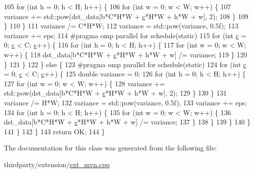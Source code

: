 \begin{DoxyCode}
105                         \textcolor{keywordflow}{for} (\textcolor{keywordtype}{int} h = 0; h < H; h++) \{
106                             \textcolor{keywordflow}{for} (\textcolor{keywordtype}{int} w = 0; w < W; w++) \{
107                                 variance += std::pow(dst\_data[b*C*H*W + \hyperlink{CMakeCache_8txt_aac1d6a1710812201527c735f7c6afbaa}{c}*H*W + h*W + w], 2);
108                             \}
109                         \}
110                     \}
111                     variance /= C*H*W;
112                     variance = std::pow(variance, 0.5f);
113                     variance += eps;
114 \textcolor{preprocessor}{                    #pragma omp parallel for schedule(static)}
115                     \textcolor{keywordflow}{for} (\textcolor{keywordtype}{int} \hyperlink{CMakeCache_8txt_aac1d6a1710812201527c735f7c6afbaa}{c} = 0; \hyperlink{CMakeCache_8txt_aac1d6a1710812201527c735f7c6afbaa}{c} < C; \hyperlink{CMakeCache_8txt_aac1d6a1710812201527c735f7c6afbaa}{c}++) \{
116                         \textcolor{keywordflow}{for} (\textcolor{keywordtype}{int} h = 0; h < H; h++) \{
117                             \textcolor{keywordflow}{for} (\textcolor{keywordtype}{int} w = 0; w < W; w++) \{
118                                 dst\_data[b*C*H*W + \hyperlink{CMakeCache_8txt_aac1d6a1710812201527c735f7c6afbaa}{c}*H*W + h*W + w] /= variance;
119                             \}
120                         \}
121                     \}
122                 \} \textcolor{keywordflow}{else} \{
123 \textcolor{preprocessor}{                    #pragma omp parallel for schedule(static)}
124                     \textcolor{keywordflow}{for} (\textcolor{keywordtype}{int} \hyperlink{CMakeCache_8txt_aac1d6a1710812201527c735f7c6afbaa}{c} = 0; \hyperlink{CMakeCache_8txt_aac1d6a1710812201527c735f7c6afbaa}{c} < C; \hyperlink{CMakeCache_8txt_aac1d6a1710812201527c735f7c6afbaa}{c}++) \{
125                         \textcolor{keywordtype}{double} variance = 0;
126                         \textcolor{keywordflow}{for} (\textcolor{keywordtype}{int} h = 0; h < H; h++) \{
127                             \textcolor{keywordflow}{for} (\textcolor{keywordtype}{int} w = 0; w < W; w++) \{
128                                 variance += std::pow(dst\_data[b*C*H*W + \hyperlink{CMakeCache_8txt_aac1d6a1710812201527c735f7c6afbaa}{c}*H*W + h*W + w], 2);
129                             \}
130                         \}
131                         variance /= H*W;
132                         variance = std::pow(variance, 0.5f);
133                         variance += eps;
134                         \textcolor{keywordflow}{for} (\textcolor{keywordtype}{int} h = 0; h < H; h++) \{
135                             \textcolor{keywordflow}{for} (\textcolor{keywordtype}{int} w = 0; w < W; w++) \{
136                                 dst\_data[b*C*H*W + \hyperlink{CMakeCache_8txt_aac1d6a1710812201527c735f7c6afbaa}{c}*H*W + h*W + w] /= variance;
137                             \}
138                         \}
139                     \}
140                 \}
141             \}
142         \}
143         \textcolor{keywordflow}{return} OK;
144     \}
\end{DoxyCode}


The documentation for this class was generated from the following file\+:\begin{DoxyCompactItemize}
\item 
thirdparty/extension/\hyperlink{ext__mvn_8cpp}{ext\+\_\+mvn.\+cpp}\end{DoxyCompactItemize}

